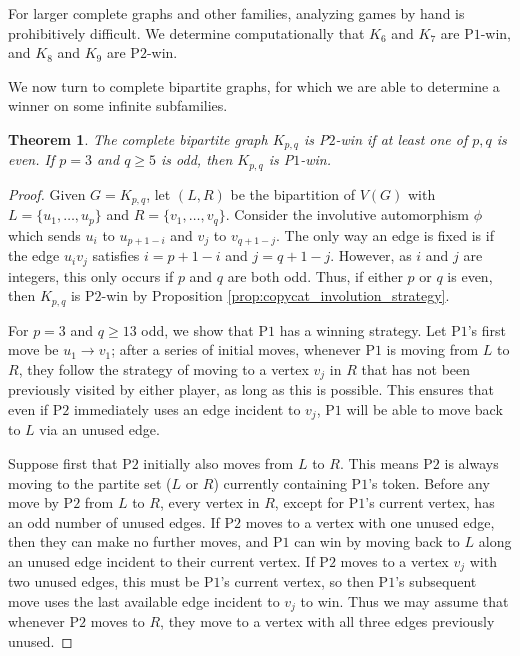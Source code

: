 \documentclass{article}
\theoremstyle{plain}
\newtheorem{theorem}{Theorem}
\theoremstyle{definition}
\def\pone{{\rm{P}\ensuremath{1}}}
\def\ptwo{{\rm{P}\ensuremath{2}}}
\def\poneposs{{\rm{P}\ensuremath{1}'s}}
\begin{document}
For larger complete graphs and other families, analyzing games by hand is prohibitively difficult. We determine computationally that $K_6$ and $K_7$ are \pone{}-win, and $K_8$ and $K_9$ are \ptwo{}-win.


We now turn to complete bipartite graphs, for which we are able to determine a winner on some infinite subfamilies. 

\begin{theorem}
\label{prop:complete_bipartite}
    The complete bipartite graph $K_{p,q}$ is \ptwo{}-win if at least one of $p, q$ is even. If $p=3$ and $q \geq 5$ is odd, then $K_{p,q}$ is \pone{}-win.
\end{theorem}
\begin{proof}
Given $G = K_{p,q}$, let $(L,R)$ be the bipartition of $V(G)$ with $L=\{u_1,\dots,u_p\}$ and $R=\{v_1,\dots,v_q\}$. Consider the involutive automorphism $\phi$ which sends $u_i$ to $u_{p+1-i}$ and $v_j$ to $v_{q+1-j}$. The only way an edge is fixed is if the edge $u_iv_j$ satisfies $i=p+1-i$ and $j=q+1-j$. However, as $i$ and $j$ are integers, this only occurs if $p$ and $q$ are both odd. Thus, if either $p$ or $q$ is even, then $K_{p,q}$ is \ptwo{}-win by Proposition \ref{prop:copycat_involution_strategy}.

For $p=3$ and $q \ge 13$ odd, we show that \pone{} has a winning strategy. Let \poneposs{} first move be $u_1 \to v_1$; after a series of initial moves, whenever \pone{} is moving from $L$ to $R$, they follow the strategy of moving to a vertex $v_j$ in $R$ that has not been previously visited by either player, as long as this is possible. This ensures that even if \ptwo{} immediately uses an edge incident to $v_j$, \pone{} will be able to move back to $L$ via an unused edge.

Suppose first that \ptwo{} initially also moves from $L$ to $R$. This means \ptwo{} is always moving to the partite set ($L$ or $R$) currently containing \poneposs{} token. Before any move by \ptwo{} from $L$ to $R$, every vertex in $R$, except for \pone{}'s current vertex, has an odd number of unused edges. If \ptwo{} moves to a vertex with one unused edge, then they can make no further moves, and \pone{} can win by moving back to $L$ along an unused edge incident to their current vertex. If \ptwo{} moves to a vertex $v_j$ with two unused edges, this must be \pone{}'s current vertex, so then \poneposs{} subsequent move uses the last available edge incident to $v_j$ to win. Thus we may assume that whenever \ptwo{} moves to $R$, they move to a vertex with all three edges previously unused.


\end{proof}
\end{document}
